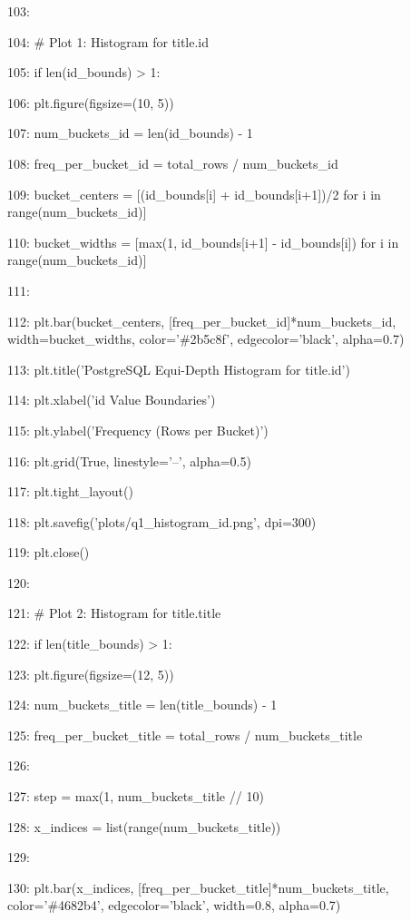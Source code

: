 \documentclass[11pt,a4paper]{article}
\begin{document}
103:

104:     \# Plot 1: Histogram for title.id

105:     if len(id\_bounds) > 1:

106:         plt.figure(figsize=(10, 5))

107:         num\_buckets\_id = len(id\_bounds) - 1

108:         freq\_per\_bucket\_id = total\_rows / num\_buckets\_id

109:         bucket\_centers = [(id\_bounds[i] + id\_bounds[i+1])/2 for i in range(num\_buckets\_id)]

110:         bucket\_widths = [max(1, id\_bounds[i+1] - id\_bounds[i]) for i in range(num\_buckets\_id)]

111:

112:         plt.bar(bucket\_centers, [freq\_per\_bucket\_id]*num\_buckets\_id, width=bucket\_widths, color='\#2b5c8f', edgecolor='black', alpha=0.7)

113:         plt.title('PostgreSQL Equi-Depth Histogram for title.id')

114:         plt.xlabel('id Value Boundaries')

115:         plt.ylabel('Frequency (Rows per Bucket)')

116:         plt.grid(True, linestyle='--', alpha=0.5)

117:         plt.tight\_layout()

118:         plt.savefig('plots/q1\_histogram\_id.png', dpi=300)

119:         plt.close()

120:

121:     \# Plot 2: Histogram for title.title

122:     if len(title\_bounds) > 1:

123:         plt.figure(figsize=(12, 5))

124:         num\_buckets\_title = len(title\_bounds) - 1

125:         freq\_per\_bucket\_title = total\_rows / num\_buckets\_title

126:

127:         step = max(1, num\_buckets\_title // 10)

128:         x\_indices = list(range(num\_buckets\_title))

129:

130:         plt.bar(x\_indices, [freq\_per\_bucket\_title]*num\_buckets\_title, color='\#4682b4', edgecolor='black', width=0.8, alpha=0.7)
\end{document}
